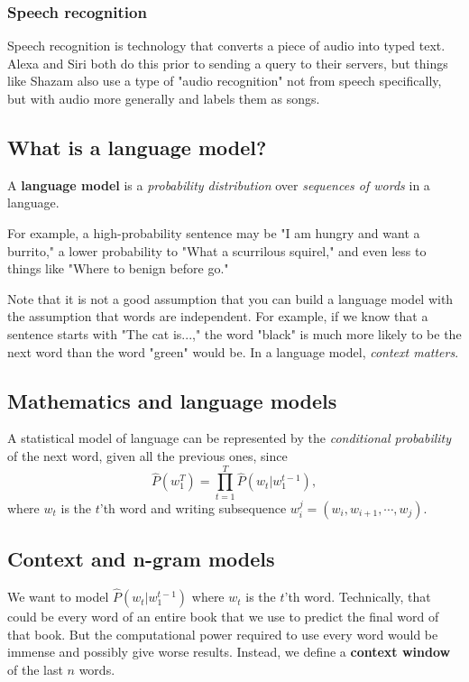 \documentclass[titlepage, 12pt, leqno]{article}
\begin{document}
\subsubsection{Speech recognition}
Speech recognition is technology that converts a piece of audio into typed
text. Alexa and Siri both do this prior to sending a query to their servers, but
things like Shazam also use a type of "audio recognition" not from speech
specifically, but with audio more generally and labels them as songs.

\subsection{What is a language model?}
\begin{definition}
    A \textbf{language model} is a \textit{probability distribution} over
    \textit{sequences of words} in a language.
\end{definition}
For example, a high-probability sentence may be "I am hungry and want a 
burrito," a lower probability to "What a scurrilous squirel," and even less to
things like "Where to benign before go."

Note that it is not a good assumption that you can build a language model with 
the assumption that words are independent. For example, if we know that a
sentence starts with "The cat is...," the word "black" is much more likely to
be the next word than the word "green" would be. In a language model,
\textit{context matters}.

\subsection{Mathematics and language models}
A statistical model of language can be represented by the
\textit{conditional probability} of the next word, given all the previous ones,
since
\[
\hat P(w_{1}^{T}) = \prod_{t=1}^{T}\hat P(w_{t}|w_{1}^{t-1}),
\]
where $w_{t}$ is the $t$'th word and writing subsequence $w_{i}^{j} = 
(w_{i}, w_{i+1}, \cdots , w_{j})$.

\subsection{Context and n-gram models}
We want to model $\hat P(w_{t}|w_{1}^{t-1})$ where $w_{t}$ is the $t$'th
word. Technically, that could be every word of an entire book that we use to
predict the final word of that book. But the computational power required to
use every word would be immense and possibly give worse results. Instead, we
define a \textbf{context window} of the last $n$ words.
\end{document}
